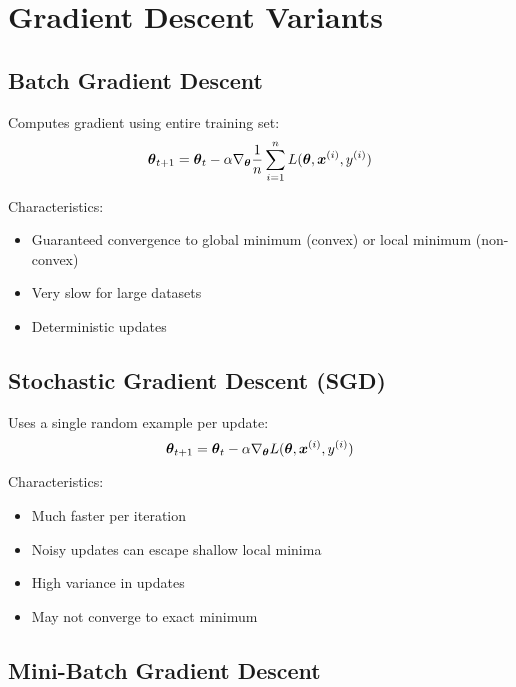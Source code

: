 
\section{Gradient Descent Variants}
\label{sec:gd-variants}

\subsection{Batch Gradient Descent}

Computes gradient using entire training set:
\begin{equation}
\boldsymbol{\theta}_{t+1} = \boldsymbol{\theta}_t - \alpha \nabla_{\boldsymbol{\theta}} \frac{1}{n} \sum_{i=1}^{n} L(\boldsymbol{\theta}, \boldsymbol{x}^{(i)}, y^{(i)})
\end{equation}

Characteristics:
\begin{itemize}
    \item Guaranteed convergence to global minimum (convex) or local minimum (non-convex)
    \item Very slow for large datasets
    \item Deterministic updates
\end{itemize}

\subsection{Stochastic Gradient Descent (SGD)}

Uses a single random example per update:
\begin{equation}
\boldsymbol{\theta}_{t+1} = \boldsymbol{\theta}_t - \alpha \nabla_{\boldsymbol{\theta}} L(\boldsymbol{\theta}, \boldsymbol{x}^{(i)}, y^{(i)})
\end{equation}

Characteristics:
\begin{itemize}
    \item Much faster per iteration
    \item Noisy updates can escape shallow local minima
    \item High variance in updates
    \item May not converge to exact minimum
\end{itemize}

\subsection{Mini-Batch Gradient Descent}

